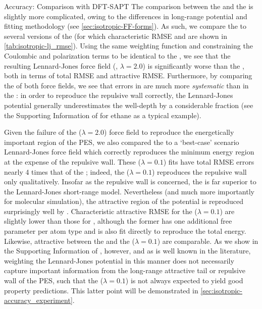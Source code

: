 \begin{subsection}{Accuracy: Comparison with DFT-SAPT}
The comparison between the \isaffold and the \ljff is slightly more complicated,
owing to the differences in long-range potential and fitting methodology (see
\cref{sec:isotropic-FF-forms}). As such, we compare the \isaffold to several versions of the
\ljff (for which characteristic RMSE and \mse are shown in 
\cref{tab:isotropic-lj_rmse}). Using the same weighting function and
constraining the Coulombic and polarization terms to be identical to the
\isaffold, we see that the resulting Lennard-Jones force field (\ljff,
$\lambda=2.0$) is significantly worse than the \isaffold, both in terms of total
RMSE and attractive RMSE. Furthermore, by comparing the \mse
of both force fields, we see that errors in
\ljff are much more \emph{systematic} than in the \isaffold: in order to
reproduce the repulsive wall correctly, the Lennard-Jones potential
generally underestimates the well-depth by a considerable fraction (see
the Supporting Information of  for ethane as a typical example). 

Given the failure of the \ljff ($\lambda=2.0$) force field to reproduce the
energetically important region of the PES, we also compared the \isaffold to a
`best-case' scenario Lennard-Jones force field which correctly
reproduces the minimum energy region at the expense of the repulsive wall. These
\ljff ($\lambda=0.1$) fits have total RMSE errors nearly 4 times that of the
\isaffold; indeed, the \ljff ($\lambda=0.1$) reproduces the repulsive wall only
qualitatively. Insofar as the repulsive wall is concerned, the \isaffold is far
superior to the Lennard-Jones short-range model. Nevertheless (and much more
importantly for molecular simulation), the attractive region of the potential
is reproduced surprisingly well by \ljff. Characteristic attractive RMSE for
the \ljff ($\lambda=0.1$) are slightly lower than those for \isaffold, although
the former has one additional free parameter per atom type and is also fit directly
to reproduce the total energy. Likewise, attractive \mse between the
\isaffold and the \ljff ($\lambda=0.1$) are comparable. As we show in the
Supporting Information of ,
however, and as is well known in the literature, weighting the Lennard-Jones potential in this
manner does not necessarily capture important information from the long-range attractive tail or repulsive wall of the PES, such
that the \ljff ($\lambda=0.1$) is not always expected to yield good
property predictions. This latter point will be demonstrated in 
\cref{sec:isotropic-accuracy_experiment}.


\end{subsection}
